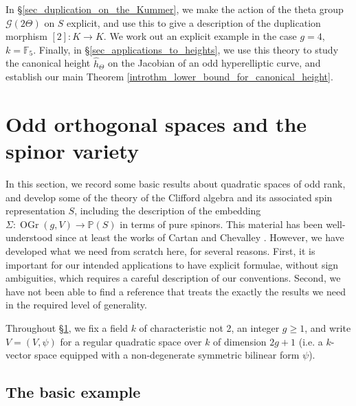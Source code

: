 \documentclass{article} %
\numberwithin{equation}{section}
\renewcommand{\P}{\mathbb{P}}
\newcommand{\F}{\mathbb{F}}
\DeclareMathOperator{\OGr}{OGr}
\begin{document}
In \S \ref{sec_duplication_on_the_Kummer}, we make the action of the theta group $\mathcal{G}(2 \Theta)$ on $S$ explicit, and use this to give a description of the duplication morphism $[2] : K \to K$. We work out an explicit example in the case $g = 4$, $k = \F_5$. Finally, in \S \ref{sec_applications_to_heights}, we use this theory to study the canonical height $\widehat{h}_\Theta$ on the Jacobian of an odd hyperelliptic curve, and establish our main Theorem \ref{introthm_lower_bound_for_canonical_height}.

\section{Odd orthogonal spaces and the spinor variety}\label{sec_odd_orthogonal_spaces}

In this section, we record some basic results about quadratic spaces of odd rank, and develop some of the theory of the Clifford algebra and its associated spin representation $S$, including the  description of the embedding $\Sigma : \OGr(g, V) \to \P(S)$ in terms of pure spinors. This material has been well-understood since at least the works of Cartan and Chevalley \cite{Car67, Che97}. However, we have developed what we need from scratch here, for several reasons. First, it is important for our intended applications to have explicit formulae, without sign ambiguities, which requires a careful description of our conventions. Second, we have not been able to find a reference that treats the exactly the results we need in the required level of generality. 

Throughout \S \ref{sec_odd_orthogonal_spaces}, we fix a field $k$ of characteristic not 2, an integer $g \geq 1$, and write $V = (V, \psi)$ for a regular quadratic space over $k$ of dimension $2g + 1$ (i.e. a $k$-vector space equipped with a non-degenerate symmetric bilinear form $\psi$).

\subsection{The basic example}\label{subsec_basic_definitions}
\end{document}
